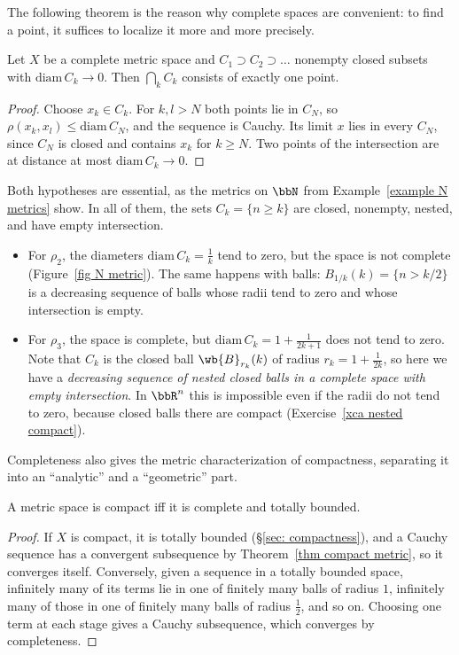 The following theorem is the reason why complete spaces are convenient: to find a point, it suffices to localize it more and more precisely.

\begin{thm}\label{thm Cantor intersection}
    Let $X$ be a complete metric space and $C_1\supset C_2\supset\ldots$ nonempty closed subsets with $\mathrm{diam}\,C_k\to0$. Then $\bigcap_kC_k$ consists of exactly one point.
\end{thm}
\begin{proof}
    Choose $x_k\in C_k$. For $k,l>N$ both points lie in $C_N$, so $\rho(x_k,x_l)\leq\mathrm{diam}\,C_N$, and the sequence is Cauchy. Its limit $x$ lies in every $C_N$, since $C_N$ is closed and contains $x_k$ for $k\geq N$. Two points of the intersection are at distance at most $\mathrm{diam}\,C_k\to0$.
\end{proof}

Both hypotheses are essential, as the metrics on $\bbN$ from Example~\ref{example N metrics} show. In all of them, the sets $C_k=\{n\geq k\}$ are closed, nonempty, nested, and have empty intersection.
\begin{itemize}
    \item For $\rho_2$, the diameters $\mathrm{diam}\,C_k=\frac1k$ tend to zero, but the space is not complete (Figure~\ref{fig N metric}). The same happens with balls: $B_{1/k}(k)=\{n>k/2\}$ is a decreasing sequence of balls whose radii tend to zero and whose intersection is empty.
    \item For $\rho_3$, the space is complete, but $\mathrm{diam}\,C_k=1+\frac1{2k+1}$ does not tend to zero. Note that $C_k$ is the closed ball $\wb{B}_{r_k}(k)$ of radius $r_k=1+\frac{1}{2k}$, so here we have a \emph{decreasing sequence of nested closed balls in a complete space with empty intersection}. In $\bbR^n$ this is impossible even if the radii do not tend to zero, because closed balls there are compact (Exercise~\ref{xca nested compact}).
\end{itemize}

Completeness also gives the metric characterization of compactness, separating it into an ``analytic'' and a ``geometric'' part.

\begin{thm}\label{thm compact complete totally bounded}
    A metric space is compact iff it is complete and totally bounded.
\end{thm}
\begin{proof}
    If $X$ is compact, it is totally bounded (\S\ref{sec: compactness}), and a Cauchy sequence has a convergent subsequence by Theorem~\ref{thm compact metric}, so it converges itself. Conversely, given a sequence in a totally bounded space, infinitely many of its terms lie in one of finitely many balls of radius $1$, infinitely many of those in one of finitely many balls of radius $\frac12$, and so on. Choosing one term at each stage gives a Cauchy subsequence, which converges by completeness.
\end{proof}

